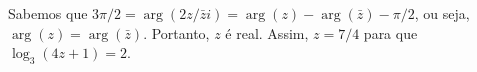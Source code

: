 \begin{questions}
\begin{solution}
\end{solution}

\begin{solution}
    Sabemos que $3\pi/2 = \arg(2z/\bar z i) = \arg(z)-\arg(\bar z) - \pi/2$, ou seja, $\arg(z) = \arg(\bar z)$. Portanto, $z$ é real. Assim, $z=7/4$ para que $\log_3(4z+1)=2$.
\end{solution}

\end{questions}
